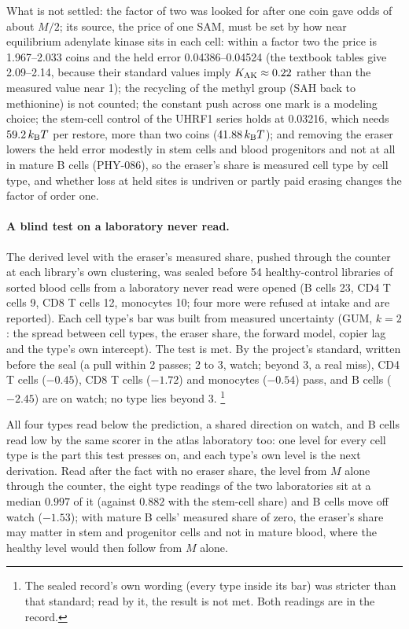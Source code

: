 What is not settled: the factor of two was looked for after one coin gave odds of about $M/2$; its source, the price of one SAM, must be
set by how near equilibrium adenylate kinase sits in each cell: within a factor two the price is 1.967--2.033 coins and the held error
0.04386--0.04524 (the textbook tables give 2.09--2.14, because their standard values imply $K_{\rm AK}\approx0.22$ rather than the measured value near 1);
the recycling of the methyl group (SAH back to methionine) is not counted; the constant push across one mark is a modeling choice; the stem-cell control of the UHRF1 series holds at 0.03216,
which needs $59.2\,k_{\mathrm B} T$ per restore, more than two coins ($41.88\,k_{\mathrm B} T$); and removing the eraser lowers the held error modestly in stem cells and blood progenitors and not at all in mature B cells (PHY-086), so the eraser's share is measured cell type by cell type, and
whether loss at held sites is undriven or partly paid erasing changes the factor of order one. \openprob

\paragraph{A blind test on a laboratory never read.} The derived level with the eraser's measured share, pushed through the counter at each
library's own clustering, was sealed before 54 healthy-control libraries of sorted blood cells from a laboratory never read were opened
(B cells 23, CD4 T cells 9, CD8 T cells 12, monocytes 10; four more were refused at intake and are reported). Each cell type's bar was
built from measured uncertainty (GUM, $k=2$: the spread between cell types, the eraser share, the forward model, copier lag and the
type's own intercept). The test is met. By the project's standard, written before the seal (a pull within 2 passes; 2 to 3, watch; beyond 3, a real
miss), CD4 T cells ($-0.45$), CD8 T cells ($-1.72$) and monocytes ($-0.54$) pass, and B cells ($-2.45$) are on watch; no type lies beyond 3.
\footnote{The sealed record's own wording (every type inside its bar) was stricter than that standard; read by it, the result is not met. Both readings are in the record.} \prediction

All four types read below the prediction, a shared direction on watch, and B cells read low by the same scorer in the atlas laboratory
too: one level for every cell type is the part this test presses on, and each type's own level is the next derivation. \openprob
Read after the fact with no eraser share, the level from $M$ alone through the counter, the eight type readings of the two laboratories sit at a
median $0.997$ of it (against $0.882$ with the stem-cell share) and B cells move off watch ($-1.53$); with mature B cells' measured share of zero, the eraser's
share may matter in stem and progenitor cells and not in mature blood, where the healthy level would then follow from $M$ alone. \openprob

